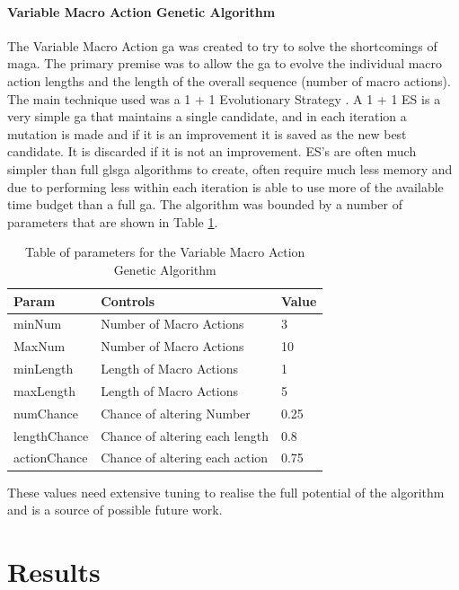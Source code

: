 \documentclass{IEEEtran}
\begin{document}
\paragraph{Variable Macro Action Genetic Algorithm}
The Variable Macro Action \gls{ga} was created to try to solve the shortcomings of \gls{maga}. The primary premise was to allow the \gls{ga} to evolve the individual macro action lengths and the length of the overall sequence (number of macro actions). The main technique used was a 1 + 1 Evolutionary Strategy \cite{t.back2000evolutionary-co}. A 1 + 1 ES is a very simple \gls{ga} that maintains a single candidate, and in each iteration a mutation is made and if it is an improvement it is saved as the new best candidate. It is discarded if it is not an improvement. ES's are often much simpler than full gls{ga} algorithms to create, often require much less memory and due to performing less within each iteration is able to use more of the available time budget than a full \gls{ga}. The algorithm was bounded by a number of parameters that are shown in Table \ref{vmagaTable}.
\begin{table}[!t]
\begin{center}
\begin{tabular}{| l | l | l |}
\hline
\textbf{Param} & \textbf{Controls} & \textbf{Value} \\
\hline
minNum & Number of Macro Actions & 3 \\
MaxNum & Number of Macro Actions & 10 \\
minLength & Length of Macro Actions & 1 \\
maxLength & Length of Macro Actions & 5 \\
numChance & Chance of altering Number & 0.25 \\
lengthChance & Chance of altering each length & 0.8 \\
actionChance & Chance of altering each action & 0.75 \\
\hline
\end{tabular}
\caption{Table of parameters for the Variable Macro Action Genetic Algorithm}
\label{vmagaTable}
\end{center}
\end{table}
These values need extensive tuning to realise the full potential of the algorithm and is a source of possible future work.
\section{Results}
\end{document}
